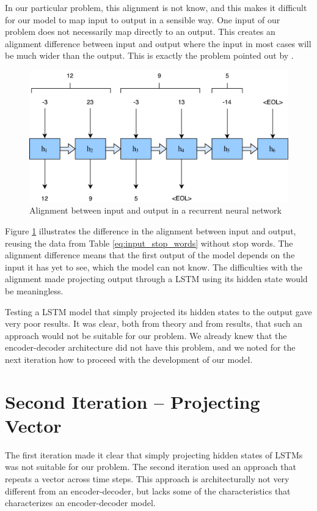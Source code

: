 In our particular problem, this alignment is not know, and this makes it difficult for our model to map input to output in a sensible way. One input of our problem does not necessarily map directly to an output. This creates an alignment difference between input and output where the input in most cases will be much wider than the output. This is exactly the problem pointed out by \citep{sutskever2014sequence}.

\begin{figure}[H]
    \centering
    \includegraphics[width=1\textwidth]{fig/development_process/lstm-alignment.pdf}
    \caption{Alignment between input and output in a recurrent neural network}
    \label{fig:lstm-alignment}
\end{figure}

Figure \ref{fig:lstm-alignment} illustrates the difference in the alignment between input and output, reusing the data from Table \ref{eq:input_stop_words} without stop words. The alignment difference means that the first output of the model depends on the input it has yet to see, which the model can not know. The difficulties with the alignment made projecting output through a LSTM using its hidden state would be meaningless. 

Testing a LSTM model that simply projected its hidden states to the output gave very poor results. It was clear, both from theory and from results, that such an approach would not be suitable for our problem. We already knew that the encoder-decoder architecture did not have this problem, and we noted for the next iteration how to proceed with the development of our model. 


\section{Second Iteration -- Projecting Vector}
The first iteration made it clear that simply projecting hidden states of LSTMs was not suitable for our problem. The second iteration used an approach that repeats a vector across time steps. This approach is architecturally not very different from an encoder-decoder, but lacks some of the characteristics that characterizes an encoder-decoder model.

